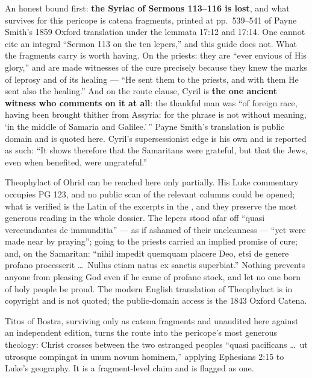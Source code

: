 \begin{witnessnote}
An honest bound first: \textbf{the Syriac of Sermons 113--116 is lost}, and what
survives for this pericope is catena fragments, printed at pp.~539--541 of
Payne Smith's 1859 Oxford translation under the lemmata 17:12 and 17:14. One
cannot cite an integral ``Sermon 113 on the ten lepers,'' and this guide does
not. What the fragments carry is worth having. On the priests: they are ``ever
envious of His glory,'' and are made witnesses of the cure precisely because
they knew the marks of leprosy and of its healing --- ``He sent them to the
priests, and with them He sent also the healing.'' And on the route clause,
Cyril is \textbf{the one ancient witness who comments on it at all}: the
thankful man was ``of foreign race, having been brought thither from Assyria:
for the phrase is not without meaning, `in the middle of Samaria and
Galilee.'\,'' Payne Smith's translation is public domain and is quoted here.
Cyril's supersessionist edge is his own and is reported as such: ``It shows
therefore that the Samaritans were grateful, but that the Jews, even when
benefited, were ungrateful.''
\end{witnessnote}

Theophylact of Ohrid can be reached here only partially. His Luke commentary
occupies PG 123, and no public scan of the relevant columns could be opened;
what is verified is the Latin of the excerpts in the , and
they preserve the most generous reading in the whole dossier. The lepers stood
afar off ``quasi verecundantes de immunditia'' --- as if ashamed of their
uncleanness --- ``yet were made near by praying''; going to the priests
carried an implied promise of cure; and, on the Samaritan: ``nihil impedit
quemquam placere Deo, etsi de genere profano processerit \dots\ Nullus etiam
natus ex sanctis superbiat.'' Nothing prevents anyone from pleasing God even
if he came of profane stock, and let no one born of holy people be proud.
The modern English translation of Theophylact is in copyright and is not
quoted; the public-domain access is the 1843 Oxford Catena.

Titus of Bostra, surviving only as catena fragments and unaudited here against
an independent edition, turns the route into the pericope's most generous
theology: Christ crosses between the two estranged peoples ``quasi pacificans
\dots\ ut utrosque compingat in unum novum hominem,'' applying Ephesians 2:15
to Luke's geography. It is a fragment-level claim and is flagged as one.

